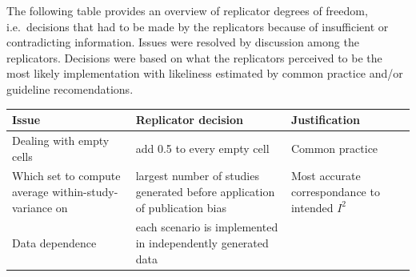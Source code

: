 \documentclass[
  english,
  doc,floatsintext,draftall]{apa6}
\begin{document}
The following table provides an overview of replicator degrees of freedom, i.e.~decisions that had to be made by the replicators because of insufficient or contradicting information.
Issues were resolved by discussion among the replicators.
Decisions were based on what the replicators perceived to be the most likely implementation with likeliness estimated by common practice and/or guideline recomendations.

\begin{longtable}[]{@{}lll@{}}
\toprule
\begin{minipage}[b]{0.33\columnwidth}\raggedright
Issue\strut
\end{minipage} & \begin{minipage}[b]{0.33\columnwidth}\raggedright
Replicator decision\strut
\end{minipage} & \begin{minipage}[b]{0.25\columnwidth}\raggedright
Justification\strut
\end{minipage}\tabularnewline
\midrule
\endhead
\begin{minipage}[t]{0.33\columnwidth}\raggedright
Dealing with empty cells\strut
\end{minipage} & \begin{minipage}[t]{0.33\columnwidth}\raggedright
add 0.5 to every empty cell\strut
\end{minipage} & \begin{minipage}[t]{0.25\columnwidth}\raggedright
Common practice\strut
\end{minipage}\tabularnewline
\begin{minipage}[t]{0.33\columnwidth}\raggedright
Which set to compute average within-study-variance on\strut
\end{minipage} & \begin{minipage}[t]{0.33\columnwidth}\raggedright
largest number of studies generated before application of publication bias\strut
\end{minipage} & \begin{minipage}[t]{0.25\columnwidth}\raggedright
Most accurate correspondance to intended \(I^2\)\strut
\end{minipage}\tabularnewline
\begin{minipage}[t]{0.33\columnwidth}\raggedright
Data dependence\strut
\end{minipage} & \begin{minipage}[t]{0.33\columnwidth}\raggedright
each scenario is implemented in independently generated data\strut
\end{minipage} & \begin{minipage}[t]{0.25\columnwidth}\raggedright

\end{minipage}
\end{longtable}
\end{document}
